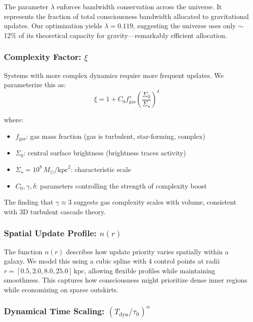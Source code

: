 \documentclass[twocolumn,prd,amsmath,amssymb,aps,superscriptaddress,nofootinbib]{revtex4-2}
\newcommand{\Msun}{M_{\odot}}
\newcommand{\kpc}{\text{kpc}}
\begin{document}
The parameter $\lambda$ enforces bandwidth conservation across the universe. It represents the fraction of total consciousness bandwidth allocated to gravitational updates. Our optimization yields $\lambda = 0.119$, suggesting the universe uses only $\sim$12\% of its theoretical capacity for gravity---remarkably efficient allocation.

\subsubsection{Complexity Factor: $\xi$}

Systems with more complex dynamics require more frequent updates. We parameterize this as:
\begin{equation}
\xi = 1 + C_0 f_{\text{gas}}^\gamma \left(\frac{\Sigma_0}{\Sigma_\star}\right)^\delta
\label{eq:complexity}
\end{equation}

where:
\begin{itemize}
\item $f_{\text{gas}}$: gas mass fraction (gas is turbulent, star-forming, complex)
\item $\Sigma_0$: central surface brightness (brightness traces activity)
\item $\Sigma_\star = 10^8\,\Msun/\kpc^2$: characteristic scale
\item $C_0, \gamma, \delta$: parameters controlling the strength of complexity boost
\end{itemize}

The finding that $\gamma \approx 3$ suggests gas complexity scales with volume, consistent with 3D turbulent cascade theory.

\subsubsection{Spatial Update Profile: $n(r)$}

The function $n(r)$ describes how update priority varies spatially within a galaxy. We model this using a cubic spline with 4 control points at radii $r = [0.5, 2.0, 8.0, 25.0]\,\kpc$, allowing flexible profiles while maintaining smoothness. This captures how consciousness might prioritize dense inner regions while economizing on sparse outskirts.

\subsubsection{Dynamical Time Scaling: $(T_{\text{dyn}}/\tau_0)^\alpha$}
\end{document}
